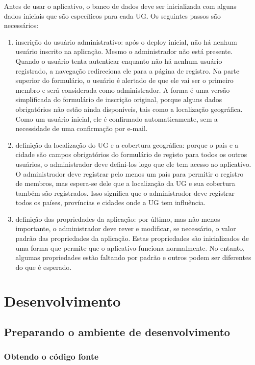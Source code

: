 \documentclass[envcountsame,envcountchap,letterpaper]{svmono}
\begin{document}
Antes de usar o aplicativo, o banco de dados deve ser inicializada com alguns dados iniciais que são específicos para cada UG. Os seguintes passos são necessários:

\begin{enumerate}
\item inscrição do usuário administrativo: após o deploy inicial, não há nenhum usuário inscrito na aplicação. Mesmo o administrador não está presente. Quando o usuário tenta autenticar enquanto não há nenhum usuário registrado, a navegação redireciona ele para a página de registro. Na parte superior do formulário, o usuário é alertado de que ele vai ser o primeiro membro e será considerada como administrador. A forma é uma versão simplificada do formulário de inscrição original, porque alguns dados obrigatórios não estão ainda disponíveis, tais como a localização geográfica. Como um usuário inicial, ele é confirmado automaticamente, sem a necessidade de uma confirmação por e-mail.
\item definição da localização do UG e a cobertura geográfica: porque o pais e a cidade são campos obrigatórios do formulário de registo para todos os outros usuários, o administrador deve defini-los logo que ele tem acesso ao aplicativo. O administrador deve registrar pelo menos um país para permitir o registro de membros, mas espera-se dele que a localização da UG e sua cobertura também são registrados. Isso significa que o administrador deve registrar todos os países, províncias e cidades onde a UG tem influência.
\item definição das propriedades da aplicação: por último, mas não menos importante, o administrador deve rever e modificar, se necessário, o valor padrão das propriedades da aplicação. Estas propriedades são inicializados de uma forma que permite que o aplicativo funciona normalmente. No entanto, algumas propriedades estão faltando por padrão e outros podem ser diferentes do que é esperado.
\end{enumerate}

\chapter{Desenvolvimento}

\section{Preparando o ambiente de desenvolvimento}

\subsection{Obtendo o código fonte}
\label{ssec:obtaining-source-code}
\end{document}
